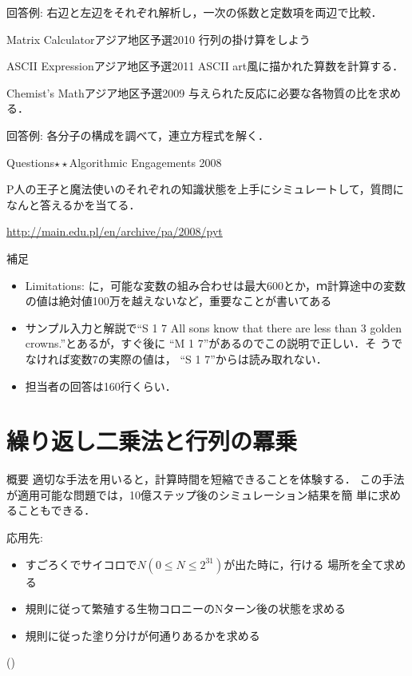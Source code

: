 回答例: 右辺と左辺をそれぞれ解析し，一次の係数と定数項を両辺で比較．

\begin{pbox}{Matrix Calculator}{アジア地区予選2010}
行列の掛け算をしよう

\end{pbox}

\begin{pbox}{ASCII Expression}{アジア地区予選2011}
ASCII art風に描かれた算数を計算する．

\end{pbox}

\begin{pbox}{Chemist's Math}{アジア地区予選2009}
与えられた反応に必要な各物質の比を求める．
  
\end{pbox}
回答例: 各分子の構成を調べて，連立方程式を解く．

\begin{pbox}{Questions$\star\star$}{Algorithmic Engagements 2008}

P人の王子と魔法使いのそれぞれの知識状態を上手にシミュレートして，質問になんと答えるかを当てる．

\url{http://main.edu.pl/en/archive/pa/2008/pyt}
\end{pbox}

補足
\begin{itemize}
\setlength{\itemsep}{0pt}
\item Limitations: に，可能な変数の組み合わせは最大600とか，ｍ計算途中の変数の値は絶対値100万を越えないなど，重要なことが書いてある
\item サンプル入力と解説で``S 1 7 	All sons know that there are less than 3 golden
  crowns.''とあるが，すぐ後に ``M 1 7''があるのでこの説明で正しい．そ
  うでなければ変数7の実際の値は， ``S 1 7''からは読み取れない．
\item 担当者の回答は160行くらい．
\end{itemize}
 \chapter{繰り返し二乗法と行列の冪乗}\label{chapter:rsquares}

\begin{itembox}[l]{概要}
適切な手法を用いると，計算時間を短縮できることを体験する．
この手法が適用可能な問題では，10億ステップ後のシミュレーション結果を簡
単に求めることもできる．

応用先:
    \begin{itemize}
\setlength{\itemsep}{0pt}
    \item すごろくでサイコロで$N (0\le N\le {2^{31}})$が出た時に，行ける
      場所を全て求める
    \item 規則に従って繁殖する生物コロニーのNターン後の状態を求める
    \item 規則に従った塗り分けが何通りあるかを求める
    \end{itemize}
(\pccbook[p.~114])
\end{itembox}

